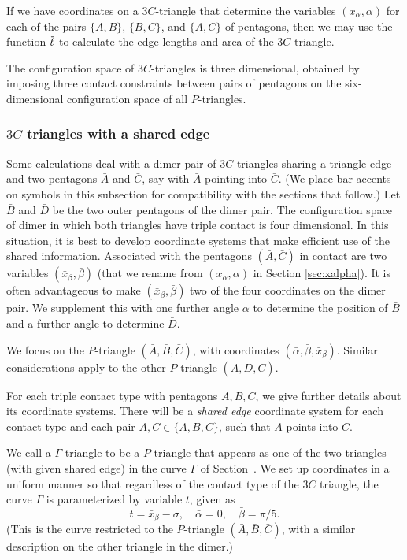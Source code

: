 If we have coordinates on a $3C$-triangle that determine the variables
$(x_\alpha,\alpha)$ for each of the pairs $\{A,B\}$, $\{B,C\}$, and $\{A,C\}$
of pentagons, then we may use the function $\bar\ell$ to calculate the edge
lengths and area of the $3C$-triangle.

The configuration space of $3C$-triangles is three dimensional,
obtained by imposing three contact constraints between pairs of
pentagons on the six-dimensional configuration space of all
$P$-triangles.

\subsubsection{$3C$ triangles with a shared edge}\label{sec:shared}

Some calculations deal with a dimer pair of $3C$ triangles sharing a
triangle edge and two pentagons $\bar{A}$ and $\bar{C}$, say with
$\bar{A}$ pointing into $\bar{C}$.  (We place bar accents on symbols
in this subsection for compatibility with the sections that follow.)
Let $\bar{B}$ and $\bar{D}$ be the two outer pentagons of the dimer
pair.  The configuration space of dimer in which both triangles have
triple contact is four dimensional.  In this situation, it is best to
develop coordinate systems that make efficient use of the shared
information.  Associated with the pentagons $(\bar{A},\bar{C})$ in
contact are two variables $(\bar x_\beta,\bar\beta)$ (that we rename
from $(x_\alpha,\alpha)$ in Section \ref{sec:xalpha}).  It is often
advantageous to make $(\bar x_\beta,\bar\beta)$ two of the four
coordinates on the dimer pair.  We supplement this with one further
angle $\bar\alpha$ to determine the position of $\bar B$ and a further
angle to determine $\bar D$.

We focus on the $P$-triangle $(\bar A,\bar B,\bar C)$, with
coordinates $(\bar\alpha,\bar\beta,\bar x_\beta)$.  Similar
considerations apply to the other $P$-triangle $(\bar A,\bar D,\bar
C)$.

For each triple contact type with pentagons $A,B,C$, we give further
details about its coordinate systems.  There will be a {\it shared
  edge} coordinate system for each contact type and each pair $\bar
A,\bar C\in \{A,B,C\}$, such that $\bar A$ points into $\bar C$.

We call a $\Gamma$-triangle to be a $P$-triangle that appears as one
of the two triangles (with given shared edge) in the curve $\Gamma$ of
Section~.  We set up coordinates in a uniform manner so
that regardless of the contact type of the $3C$ triangle, the curve
$\Gamma$ is parameterized by variable $t$, given as
\[
t = \bar x_\beta  -\sigma, \quad
\bar\alpha = 0,\quad
\bar\beta = \pi/5.
\]
  (This is the curve
restricted to the $P$-triangle $(\bar A,\bar B,\bar C)$, with a
similar description on the other triangle in the dimer.)


